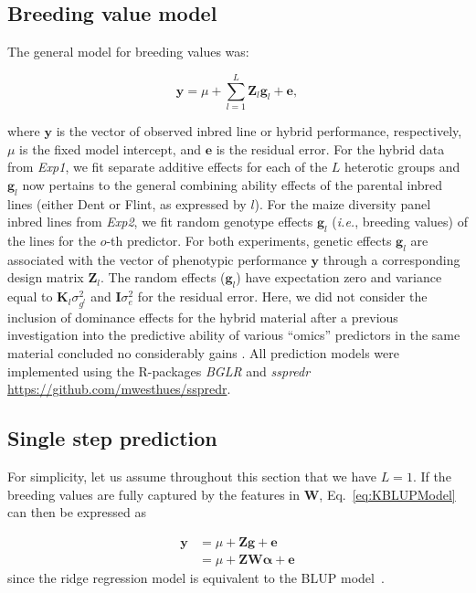 \documentclass[12pt,titlepage]{article}
\begin{document}
\subsection{Breeding value model}
The general model for breeding values was:

\begin{equation} \label{eq:KBLUPModel}
  \mathbf{y} = \mu + 
  \sum_{l=1}^{L} \mathbf{Z}_{l} \mathbf{g}_{l} + \mathbf{e},
\end{equation}

where $\mathbf{y}$ is the vector of observed inbred line or hybrid performance,
respectively, $\mu$ is the fixed model intercept, and $\mathbf{e}$ is the 
residual error.
For the hybrid data from \textit{Exp1}, we fit separate additive effects for 
each of the $L$ heterotic groups and $\mathbf{g}_{l}$ now pertains to the 
general combining ability effects of the parental inbred lines (either Dent or 
Flint, as expressed by $l$).
For the maize diversity panel inbred lines from \textit{Exp2}, we fit random 
genotype effects $\mathbf{g}_{l}$ (\textit{i.e.}, breeding values) of the 
lines for the $o$-th predictor.
For both experiments, genetic effects $\mathbf{g}_{l}$ are associated with 
the vector of phenotypic performance $\mathbf{y}$ through a corresponding 
design matrix $\mathbf{Z}_{l}$.
The random effects ($\mathbf{g}_{l}$) have expectation zero and variance equal 
to $\mathbf{K}_{l} \sigma^{2}_{{g}^{l}}$ and $\mathbf{I} \sigma^2_{e}$ 
for the residual error.
Here, we did not consider the inclusion of dominance effects for the hybrid
material after a previous investigation into the predictive ability of various
``omics'' predictors in the same material concluded no considerably gains 
\cite{Westhues2017}.
All prediction models were implemented using the R-packages \textit{BGLR}
\cite{Perez2014} and \textit{sspredr}
\url{https://github.com/mwesthues/sspredr}. 


\subsection{Single step prediction}
For simplicity, let us assume throughout this section that we have $L=1$.
If the breeding values are fully captured by the features in $\mathbf{W}$,
Eq.~\ref{eq:KBLUPModel} can then be expressed as

\begin{align} \label{eq:KBLUPModelSimplified}
	\mathbf{y} &= \mu + \mathbf{Z} \mathbf{g} + \boldsymbol{e} \\
	&= \mu + \mathbf{Z} \mathbf{W} \boldsymbol{\alpha} + \boldsymbol{e}
\end{align}
\cite{Fernando2014} since the ridge regression model is equivalent to the BLUP
model~\cite{Ruppert2003}.
\end{document}
